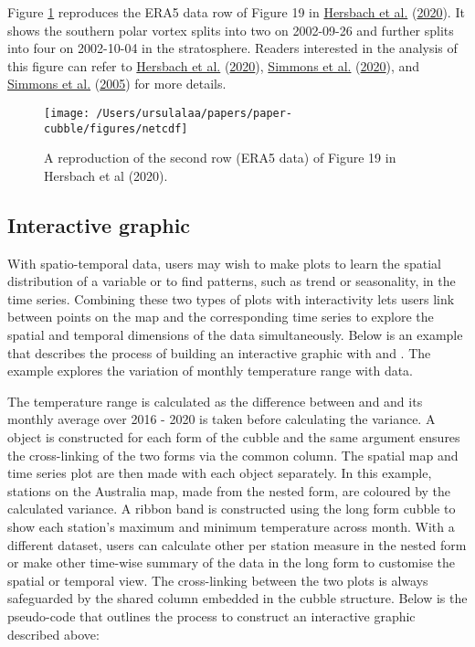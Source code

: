 \documentclass{article}
\begin{document}
Figure \ref{fig:netcdf} reproduces the ERA5 data row of Figure 19 in \protect\hyperlink{ref-hersbach2020era5}{Hersbach et al.} (\protect\hyperlink{ref-hersbach2020era5}{2020}). It shows the southern polar vortex splits into two on 2002-09-26 and further splits into four on 2002-10-04 in the stratosphere. Readers interested in the analysis of this figure can refer to \protect\hyperlink{ref-hersbach2020era5}{Hersbach et al.} (\protect\hyperlink{ref-hersbach2020era5}{2020}), \protect\hyperlink{ref-simmons2020global}{Simmons et al.} (\protect\hyperlink{ref-simmons2020global}{2020}), and \protect\hyperlink{ref-simmons2005ecmwf}{Simmons et al.} (\protect\hyperlink{ref-simmons2005ecmwf}{2005}) for more details.

\begin{figure}
\texttt{[image: /Users/ursulalaa/papers/paper-cubble/figures/netcdf]} \caption{A reproduction of the second row (ERA5 data) of Figure 19 in  Hersbach et al (2020).}\label{fig:netcdf}
\end{figure}

\hypertarget{interactive-graphic}{%
\subsection{Interactive graphic}\label{interactive-graphic}}

With spatio-temporal data, users may wish to make plots to learn the spatial distribution of a variable or to find patterns, such as trend or seasonality, in the time series. Combining these two types of plots with interactivity lets users link between points on the map and the corresponding time series to explore the spatial and temporal dimensions of the data simultaneously. Below is an example that describes the process of building an interactive graphic with  and . The example explores the variation of monthly temperature range with  data.

The temperature range is calculated as the difference between  and  and its monthly average over 2016 - 2020 is taken before calculating the variance. A  object is constructed for each form of the cubble and the same  argument ensures the cross-linking of the two forms via the common  column. The spatial map and time series plot are then made with each  object separately. In this example, stations on the Australia map, made from the nested form, are coloured by the calculated variance. A ribbon band is constructed using the long form cubble to show each station's maximum and minimum temperature across month. With a different dataset, users can calculate other per station measure in the nested form or make other time-wise summary of the data in the long form to customise the spatial or temporal view. The cross-linking between the two plots is always safeguarded by the shared  column embedded in the cubble structure. Below is the pseudo-code that outlines the process to construct an interactive graphic described above:
\end{document}
